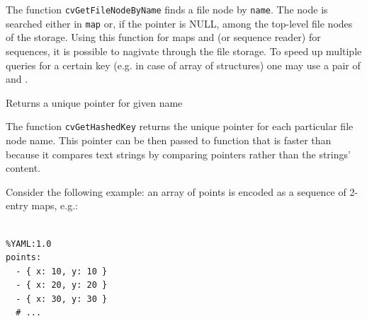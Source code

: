 \begin{description}
\end{description}


The function \texttt{cvGetFileNodeByName} finds a file node by
\texttt{name}. The node is searched either in \texttt{map} or, if the
pointer is NULL, among the top-level file nodes of the storage. Using
this function for maps and  (or sequence reader)
for sequences, it is possible to nagivate through the file storage. To
speed up multiple queries for a certain key (e.g. in case of array
of structures) one may use a pair of  and
.

\label{GetHashedKey}

Returns a unique pointer for given name


\begin{description}
\end{description}

The function \texttt{cvGetHashedKey} returns the unique pointer for
each particular file node name. This pointer can be then passed to
 function that is faster than 
because it compares text strings by comparing pointers rather than the
strings' content.

Consider the following example: an array of points is encoded as a sequence of 2-entry maps, e.g.:

\begin{lstlisting}

%YAML:1.0
points:
  - { x: 10, y: 10 }
  - { x: 20, y: 20 }
  - { x: 30, y: 30 }
  # ...

\end{lstlisting}

